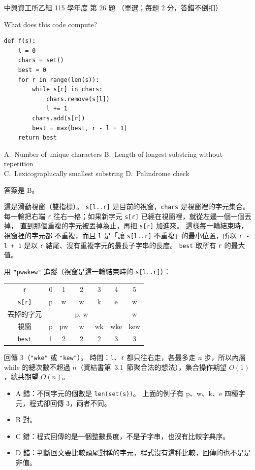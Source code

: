 \begin{pastexam}[label={px:nchu-115-is-26}]{中興資工所乙組 115 學年度 第 26 題}
（單選；每題 2 分，答錯不倒扣）

What does this code compute?
\begin{verbatim}
def f(s):
    l = 0
    chars = set()
    best = 0
    for r in range(len(s)):
        while s[r] in chars:
            chars.remove(s[l])
            l += 1
        chars.add(s[r])
        best = max(best, r - l + 1)
    return best
\end{verbatim}
A.~Number of unique characters \qquad B.~Length of longest substring without repetition\\
C.~Lexicographically smallest substring \qquad D.~Palindrome check
\end{pastexam}

\begin{pastsoln}
答案是 B。

這是滑動視窗（雙指標）。 \texttt{s[l..r]} 是目前的視窗，\texttt{chars} 是視窗裡的字元集合。
每一輪把右端 \texttt{r} 往右一格；如果新字元 \texttt{s[r]} 已經在視窗裡，就從左邊一個一個丟掉，
直到那個重複的字元被丟掉為止，再把 \texttt{s[r]} 加進來。 這樣每一輪結束時，視窗裡的字元都
不重複，而且 \texttt{l} 是「讓 \texttt{s[l..r]} 不重複」的最小位置，所以 \texttt{r - l + 1} 是以
\texttt{r} 結尾、沒有重複字元的最長子字串的長度。 \texttt{best} 取所有 \texttt{r} 的最大值。

用 \texttt{"pwwkew"} 追蹤（視窗是這一輪結束時的 \texttt{s[l..r]}）：
\begin{center}
\small
\begin{tabular}{ccccccc}
\toprule
\texttt{r} & 0 & 1 & 2 & 3 & 4 & 5 \\
\texttt{s[r]} & p & w & w & k & e & w \\
丟掉的字元 & & & p, w & & & w \\
視窗 & p & pw & w & wk & wke & kew \\
\texttt{best} & 1 & 2 & 2 & 2 & 3 & 3 \\
\bottomrule
\end{tabular}
\end{center}
回傳 $3$（\texttt{"wke"} 或 \texttt{"kew"}）。 時間：\texttt{l}、\texttt{r} 都只往右走，各最多走
$n$ 步，所以內層 while 的總次數不超過 $n$（資結書第~3.1~節聚合法的想法），集合操作期望
$O(1)$，總共期望 $O(n)$。
\begin{itemize}
\item A 錯：不同字元的個數是 \texttt{len(set(s))}。 上面的例子有 p、w、k、e 四種字元，程式卻回傳
$3$，兩者不同。
\item B 對。
\item C 錯：程式回傳的是一個整數長度，不是子字串，也沒有比較字典序。
\item D 錯：判斷回文要比較頭尾對稱的字元，程式沒有這種比較，回傳的也不是是非值。
\end{itemize}
\end{pastsoln}
